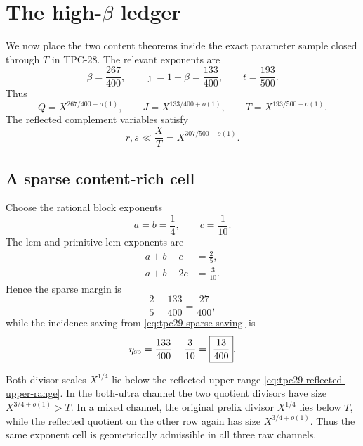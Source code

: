 \section{The high-\texorpdfstring{$\beta$}{beta} ledger}
\label{sec:tpc29-high-beta}

We now place the two content theorems inside the exact parameter sample
closed through $T$ in TPC-28.  The relevant exponents are
\begin{equation}
 \beta=\frac{267}{400},\qquad
 \jmath=1-\beta=\frac{133}{400},\qquad
 t=\frac{193}{500}.
 \label{eq:tpc29-high-parameters}
\end{equation}
Thus
\begin{equation}
 Q=X^{267/400+o(1)},\qquad
 J=X^{133/400+o(1)},\qquad
 T=X^{193/500+o(1)}.
 \label{eq:tpc29-high-scales}
\end{equation}
The reflected complement variables satisfy
\begin{equation}
 r,s\ll \frac XT=X^{307/500+o(1)}.
 \label{eq:tpc29-reflected-upper-range}
\end{equation}

\subsection{A sparse content-rich cell}

Choose the rational block exponents
\begin{equation}
 a=b=\frac14,
 \qquad
 c=\frac1{10}.
 \label{eq:tpc29-high-block}
\end{equation}
The lcm and primitive-lcm exponents are
\begin{align}
 a+b-c&=\frac25,
 \label{eq:tpc29-high-q-exponent}\\
 a+b-2c&=\frac3{10}.
 \label{eq:tpc29-high-primitive-exponent}
\end{align}
Hence the sparse margin is
\begin{equation}
 \frac25-\frac{133}{400}
 =\boxed{\frac{27}{400}},
 \label{eq:tpc29-high-sparse-margin}
\end{equation}
while the incidence saving from \eqref{eq:tpc29-sparse-saving} is
\begin{equation}
 \eta_{\rm sp}
 =\frac{133}{400}-\frac3{10}
 =\boxed{\frac{13}{400}}.
 \label{eq:tpc29-high-saving}
\end{equation}

Both divisor scales $X^{1/4}$ lie below the reflected upper range
\eqref{eq:tpc29-reflected-upper-range}.  In the both-ultra channel the
two quotient divisors have size $X^{3/4+o(1)}>T$.  In a mixed channel,
the original prefix divisor $X^{1/4}$ lies below $T$, while the
reflected quotient on the other row again has size $X^{3/4+o(1)}$.
Thus the same exponent cell is geometrically admissible in all three
raw channels.

